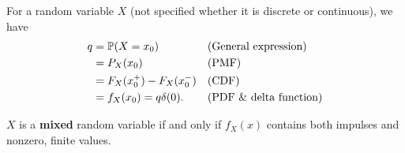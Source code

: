 \begin{theorem}
    For a random variable $X$ (not specified whether it is discrete or continuous), we have
    \begin{align*}
        q
        &= \P{X=x_0} && \text{(General expression)} \\
        &= P_X(x_0) && \text{(PMF)} \\
        &= F_X(x_0^+) - F_X(x_0^-) && \text{(CDF)} \\
        &= f_X(x_0) = q\delta(0). && \text{(PDF \& delta function)}
    \end{align*}
\end{theorem}

\begin{theorem}
    $X$ is a \textbf{mixed} random variable if and only if $f_X(x)$ contains both impulses and nonzero, finite values.
\end{theorem}